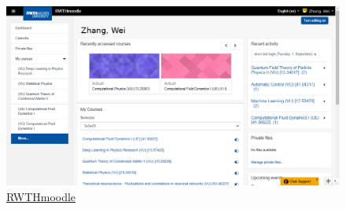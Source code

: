     \begin{figure}[H]
      \centering
      \includegraphics[width=\textwidth]{初来乍到/Management_System/RWTHmoodle.png}
      \caption{\href{https://moodle.rwth-aachen.de/}{RWTHmoodle}}
      \label{fig:RWTHmoodle}
    \end{figure}

